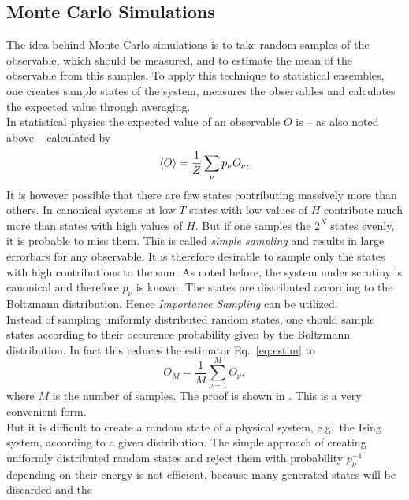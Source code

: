 \subsection{Monte Carlo Simulations}
\label{ssec:montecarlo}
    The idea behind Monte Carlo simulations is to take random samples of
    the observable, which should be measured, and to estimate the mean of
    the observable from this samples. To apply this technique to statistical
    ensembles, one creates sample states of the system, measures the
    observables and calculates the expected value through averaging.\\
    In statistical physics the expected value of an observable \(O\)
    is -- as also noted above -- calculated by
    \begin{equation}
        \left< O \right> = \frac{1}{Z} \sum_\nu p_\nu O_\nu.
        \label{eq:estim}
    \end{equation}
    It is however possible that there are few states contributing
    massively more than others. In canonical systems at low \(T\)
    states with low values of \(H\) contribute much more than states with
    high values of \(H\).
    But if one samples the \(2^N\) states evenly, it is probable to miss
    them. This is called \emph{simple sampling} and results in large
    errorbars for any observable.
    It is therefore desirable to sample only the states with high
    contributions to the sum.
    As noted before, the system under scrutiny is canonical and therefore
    \(p_\nu\) is known. The states are distributed according to the Boltzmann
    distribution. Hence \emph{Importance Sampling} can be utilized.\\
    Instead of sampling uniformly distributed random states, one should sample
    states according to their occurence probability given by the Boltzmann
    distribution. In fact this reduces the estimator Eq.\ \eqref{eq:estim} to
    \begin{equation}
        O_M = \frac{1}{M} \sum_{\nu=1}^M O_\nu,
    \end{equation}
    where \(M\) is the number of samples. The proof is shown in \cite{NewmanBarkema1999}.
    This is a very convenient form.\\
    But it is difficult to create a random state of a physical system,
    e.g.\ the Ising system, according to a given distribution. The simple
    approach of creating uniformly distributed random states and reject
    them with probability \(p_\nu^{-1}\) depending on their energy is not
    efficient, because many generated states will be discarded and the
